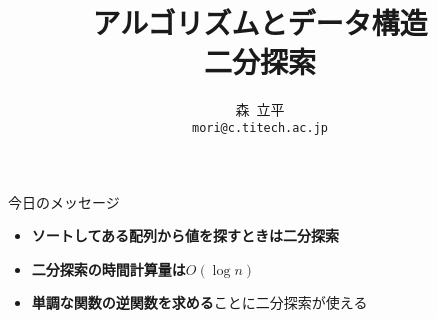 \documentclass[a4paper,twoside,onecolumn,openany,article,10pt]{memoir}
\title{アルゴリズムとデータ構造\\\vspace{.5em} \Large 二分探索}
\date{}
\author{森~立平\\ \texttt{mori@c.titech.ac.jp}}
\theoremstyle{remark}
\begin{document}
\maketitle


\noindent
今日のメッセージ
\begin{itemize}
\item \textbf{ソートしてある配列から値を探すときは二分探索}
\item \textbf{二分探索の時間計算量は$O(\log n)$}
\item \textbf{単調な関数の逆関数を求める}ことに二分探索が使える
\end{itemize}

%
%
\end{document}
